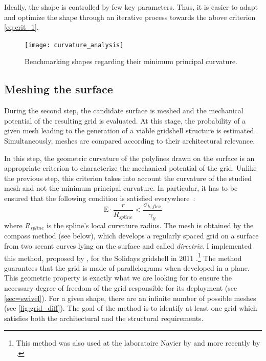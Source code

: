 Ideally, the shape is controlled by few key parameters. Thus, it is easier to adapt and optimize the shape through an iterative process towards the above criterion \cref{eq:crit_1}.

\begin{figure}[t]
\centering
\texttt{[image: curvature\_analysis]}
\caption[Benchmarking shapes regarding their curvature]{Benchmarking shapes regarding their minimum principal curvature.}
\label{fig:shape_bench}
\end{figure}

\subsection{Meshing the surface}
During the second step, the candidate surface is meshed and the mechanical potential of the resulting grid is evaluated. At this stage, the probability of a given mesh leading to the generation of a viable gridshell structure is estimated. Simultaneously, meshes are compared according to their architectural relevance.

In this step, the geometric curvature of the polylines drawn on the surface is an appropriate criterion to characterize the mechanical potential of the grid. Unlike the previous step, this criterion takes into account the curvature of the studied mesh and not the minimum principal curvature. In particular, it has to be ensured that the following condition is satisfied everywhere~:
\begin{equation}
	\mathrm{E} \cdot   \frac{r}{R_{spline}}  <   \frac{\sigma_{k,flex}}{\gamma_{lt}}
	\label{eq:crit_2}
\end{equation}
where $R_{spline}$ is the spline’s local curvature radius. The mesh is obtained by the compass method (see below), which develops a regularly spaced grid on a surface from two secant curves lying on the surface and called \emph{directrix}. I implemented this method, proposed by \citet{IL10}, for the Solidays gridshell in 2011 \cite{DuPeloux2011}.\footnote{This method was also used at the laboratoire Navier by  and more recently by .} The method guarantees that the grid is made of parallelograms when developed in a plane. This geometric property is exactly what we are looking for to ensure the necessary degree of freedom of the grid responsible for its deployment (see \cref{sec=swivel}). For a given shape, there are an infinite number of possible meshes (see \cref{fig:grid_diff}). The goal of the method is to identify at least one grid which satisfies both the architectural and the structural requirements. 

